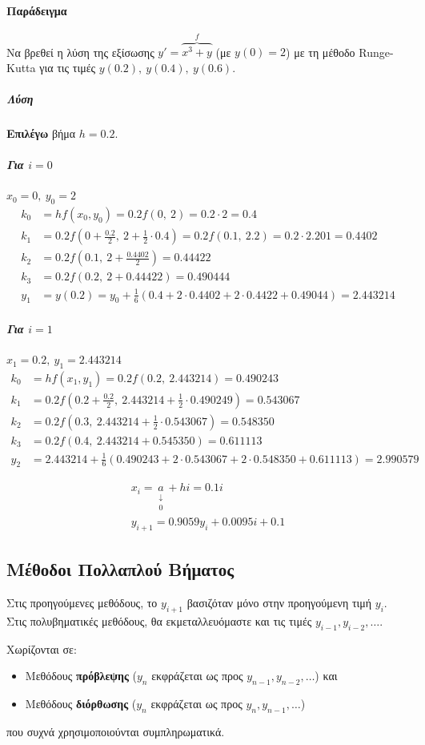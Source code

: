\documentclass[11pt,a4paper,notitlepage,fleqn]{article}
\begin{document}
\paragraph{Παράδειγμα}
Να βρεθεί η λύση της εξίσωσης \( y' = \overbrace{x^3+y}^f \)
(με \( y(0)=2 \))
με τη μέθοδο Runge-Kutta για τις τιμές \( y(0.2),\ y(0.4),\ y(0.6) \).
\subparagraph{Λύση}
\textbf{Επιλέγω} βήμα \( h=0.2 \).
\subparagraph{Για \( i=0 \)} \( x_0=0,\ y_0=2 \)
\begin{align*}
	k_0 &= hf(x_0,y_0) =
	0.2f(0,\ 2)=0.2\cdot 2 = 0.4 \\
	k_1 &= 0.2f\left(
	0+\frac{0.2}{2},\ 2+\frac{1}{2}\cdot 0.4
	\right) = 0.2f(0.1,\ 2.2) = 0.2 \cdot 2.201 = 0.4402 \\
	k_2 &= 0.2f(0.1,\ 2+\frac{0.4402}{2}) = 0.44422 \\
	k_3 &= 0.2f(0.2,\ 2+0.44422) = 0.490444 \\
	y_1 &= y(0.2) = y_0+\frac{1}{6}(
	0.4+2\cdot 0.4402+2\cdot 0.4422 + 0.49044
	) = 2.443214
\end{align*}
\subparagraph{Για \( i=1 \)} \( x_1=0.2,\ y_1=2.443214 \)
\begin{align*}
	k_0 &= hf(x_1,y_1) = 0.2f(0.2,\ 2.443214) = 
	0.490243 \\
	k_1 &= 0.2f\left( 0.2+\frac{0.2}{2},\ 2.443214+\frac{1}{2}
	\cdot 0.490249 \right) = 0.543067 \\
	k_2 &= 0.2f(0.3,\ 2.443214+\frac{1}{2}\cdot 0.543067)
	= 0.548350 \\
	k_3 &= 0.2f(0.4,\ 2.443214+0.545350) = 0.611113 \\
	y_2 &= 2.443214+\frac{1}{6}(0.490243+2\cdot 0.543067
	+2\cdot 0.548350+0.611113)
	= 2.990579
\end{align*}

\begin{gather*}
	x_i = \underset{\substack{\downarrow\\ 0}}{a}+hi=0.1i \\
	y_{i+1} = 0.9059y_i + 0.0095i + 0.1
\end{gather*}

\subsection{Μέθοδοι Πολλαπλού Βήματος}
Στις προηγούμενες μεθόδους, το \( y_{i+1} \) βασιζόταν μόνο στην
προηγούμενη τιμή \( y_i \). Στις πολυβηματικές μεθόδους, θα
εκμεταλλευόμαστε και τις τιμές \( y_{i-1},y_{i-2},\dots \).

Χωρίζονται σε:
\begin{itemize}
	\item Μεθόδους \textbf{πρόβλεψης} 
	(\( y_n \) εκφράζεται ως προς \( y_{n-1},y_{n-2},\dots \)) και
	\item Μεθόδους \textbf{διόρθωσης}
	(\( y_n \) εκφράζεται ως προς \( y_n,y_{n-1},\dots \))
\end{itemize}
που συχνά χρησιμοποιούνται συμπληρωματικά.
\end{document}
